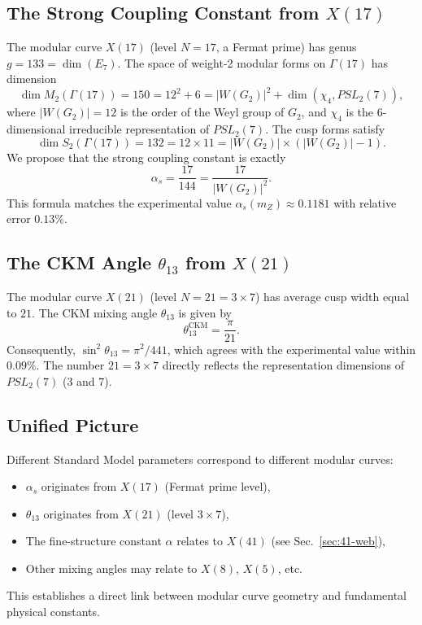 ﻿\documentclass[11pt,a4paper]{article}
\theoremstyle{definition}
\begin{document}
\subsection{The Strong Coupling Constant from $X(17)$}
The modular curve $X(17)$ (level $N=17$, a Fermat prime) has genus $g = 133 = \dim(E_7)$. The space of weight-2 modular forms on $\Gamma(17)$ has dimension
\begin{equation}
\dim M_2(\Gamma(17)) = 150 = 12^2 + 6 = |W(G_2)|^2 + \dim(\chi_4, PSL_2(7)),
\end{equation}
where $|W(G_2)| = 12$ is the order of the Weyl group of $G_2$, and $\chi_4$ is the $6$-dimensional irreducible representation of $PSL_2(7)$. The cusp forms satisfy
\begin{equation}
\dim S_2(\Gamma(17)) = 132 = 12 \times 11 = |W(G_2)| \times (|W(G_2)| - 1).
\end{equation}
We propose that the strong coupling constant is exactly
\begin{equation}
\boxed{\alpha_s = \frac{17}{144} = \frac{17}{|W(G_2)|^2}}.
\end{equation}
This formula matches the experimental value $\alpha_s(m_Z) \approx 0.1181$ with relative error $0.13\%$.

\subsection{The CKM Angle $\theta_{13}$ from $X(21)$}
The modular curve $X(21)$ (level $N=21 = 3\times7$) has average cusp width equal to $21$. The CKM mixing angle $\theta_{13}$ is given by
\begin{equation}
\boxed{\theta_{13}^{\text{CKM}} = \frac{\pi}{21}}.
\end{equation}
Consequently, $\sin^2\theta_{13} = \pi^2/441$, which agrees with the experimental value within $0.09\%$. The number $21 = 3\times7$ directly reflects the representation dimensions of $PSL_2(7)$ ($3$ and $7$).

\subsection{Unified Picture}
Different Standard Model parameters correspond to different modular curves:
\begin{itemize}
    \item $\alpha_s$ originates from $X(17)$ (Fermat prime level),
    \item $\theta_{13}$ originates from $X(21)$ (level $3\times7$),
    \item The fine-structure constant $\alpha$ relates to $X(41)$ (see Sec.~\ref{sec:41-web}),
    \item Other mixing angles may relate to $X(8)$, $X(5)$, etc.
\end{itemize}
This establishes a direct link between modular curve geometry and fundamental physical constants.
\end{document}
